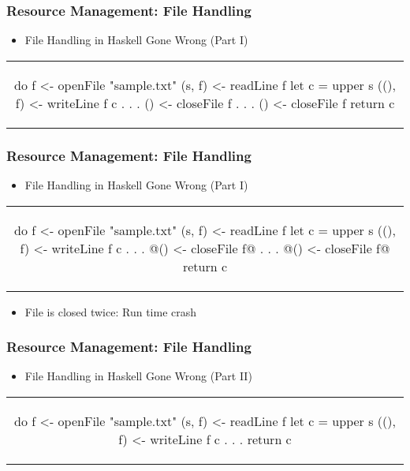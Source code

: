 \begin{frame}[fragile, c]
  \frametitle{Resource Management: File Handling}
  \begin{center}
    \begin{itemize}
    \item File Handling in Haskell Gone Wrong (Part I)
    \end{itemize}
    \begin{tabular}[h]{c}
    \begin{haskell}
      do f  <- openFile "sample.txt"
         (s, f)  <- readLine f
         let c = upper s
         ((), f) <- writeLine f c
              .
              .
              .
         () <- closeFile f
              .
              .
              .
         () <- closeFile f
         return c
    \end{haskell}
    \end{tabular}
  \end{center}
\end{frame}

\begin{frame}[fragile, c]
  \frametitle{Resource Management: File Handling}
  \begin{center}
    \begin{itemize}
    \item File Handling in Haskell Gone Wrong (Part I)
    \end{itemize}
    \begin{tabular}[h]{c}
    \begin{haskell}
      do f  <- openFile "sample.txt"
         (s, f)  <- readLine f
         let c = upper s
         ((), f) <- writeLine f c
              .
              .
              .
        @() <- closeFile f@
              .
              .
              .
        @() <- closeFile f@
         return c
    \end{haskell}
    \end{tabular}
    \begin{itemize}
    \item File is closed twice: Run time crash
    \end{itemize}
  \end{center}
\end{frame}

\begin{frame}[fragile, c]
  \frametitle{Resource Management: File Handling}
  \begin{center}

  \begin{itemize}
  \item File Handling in Haskell Gone Wrong (Part II)
  \end{itemize}
  \begin{tabular}[h]{c}
    \begin{haskell}
    do f  <- openFile "sample.txt"
       (s, f)  <- readLine f
       let c = upper s
       ((), f) <- writeLine f c
           .
           .
           .
       return c
     \end{haskell}
  \end{tabular}

\end{center}
\end{frame}

